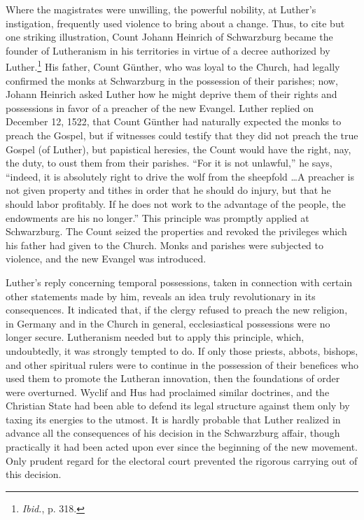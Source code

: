 Where the magistrates were unwilling, the powerful nobility, at
Luther’s instigation, frequently used violence to bring about a change.
Thus, to cite but one striking illustration, Count Johann Heinrich
of Schwarzburg became the founder of Lutheranism in his territories
in virtue of a decree authorized by Luther.\footnote{\textit{Ibid.}, p. 318.}
His father, Count Günther, who was loyal to the Church, had legally confirmed the
monks at Schwarzburg in the possession of their parishes; now, Johann
Heinrich asked Luther how he might deprive them of their rights
and possessions in favor of a preacher of the new Evangel. Luther
replied on December 12, 1522, that Count Günther had naturally
expected the monks to preach the Gospel, but if witnesses could
testify that they did not preach the true Gospel (of Luther), but
papistical heresies, the Count would have the right, nay, the duty, to
oust them from their parishes. “For it is not unlawful,” he says, “indeed,
it is absolutely right to drive the wolf from the sheepfold \dots A
preacher is not given property and tithes in order that he
should do injury, but that he should labor profitably. If he does not
work to the advantage of the people, the endowments are his no
longer.” This principle was promptly applied at Schwarzburg. The
Count seized the properties and revoked the privileges which his
father had given to the Church. Monks and parishes were subjected
to violence, and the new Evangel was introduced.

Luther’s reply concerning temporal possessions, taken in connection
with certain other statements made by him, reveals an idea truly
revolutionary in its consequences. It indicated that, if the clergy refused
to preach the new religion, in Germany and in the Church in
general, ecclesiastical possessions were no longer secure. Lutheranism
needed but to apply this principle, which, undoubtedly, it was
strongly tempted to do. If only those priests, abbots, bishops, and
other spiritual rulers were to continue in the possession of their benefices
who used them to promote the Lutheran innovation, then the
foundations of order were overturned. Wyclif and Hus had proclaimed similar
doctrines, and the Christian State had been able to defend its legal structure
against them only by taxing its energies to the utmost. It is hardly probable
that Luther realized in advance all the
consequences of his decision in the Schwarzburg affair, though practically
it had been acted upon ever since the beginning of the new
movement. Only prudent regard for the electoral court prevented
the rigorous carrying out of this decision.
